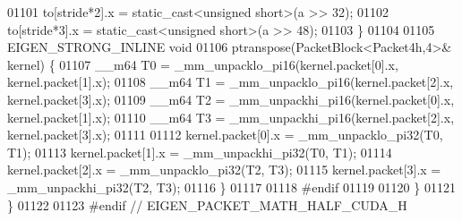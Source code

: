 \begin{DoxyCode}
01101   to[stride*2].x = \textcolor{keyword}{static\_cast<}\textcolor{keywordtype}{unsigned} \textcolor{keywordtype}{short}\textcolor{keyword}{>}(a >> 32);
01102   to[stride*3].x = \textcolor{keyword}{static\_cast<}\textcolor{keywordtype}{unsigned} \textcolor{keywordtype}{short}\textcolor{keyword}{>}(a >> 48);
01103 \}
01104 
01105 EIGEN\_STRONG\_INLINE \textcolor{keywordtype}{void}
01106 ptranspose(PacketBlock<Packet4h,4>& kernel) \{
01107   \_\_m64 T0 = \_mm\_unpacklo\_pi16(kernel.packet[0].x, kernel.packet[1].x);
01108   \_\_m64 T1 = \_mm\_unpacklo\_pi16(kernel.packet[2].x, kernel.packet[3].x);
01109   \_\_m64 T2 = \_mm\_unpackhi\_pi16(kernel.packet[0].x, kernel.packet[1].x);
01110   \_\_m64 T3 = \_mm\_unpackhi\_pi16(kernel.packet[2].x, kernel.packet[3].x);
01111 
01112   kernel.packet[0].x = \_mm\_unpacklo\_pi32(T0, T1);
01113   kernel.packet[1].x = \_mm\_unpackhi\_pi32(T0, T1);
01114   kernel.packet[2].x = \_mm\_unpacklo\_pi32(T2, T3);
01115   kernel.packet[3].x = \_mm\_unpackhi\_pi32(T2, T3);
01116 \}
01117 
01118 \textcolor{preprocessor}{#endif}
01119 
01120 \}
01121 \}
01122 
01123 \textcolor{preprocessor}{#endif // EIGEN\_PACKET\_MATH\_HALF\_CUDA\_H}
\end{DoxyCode}

